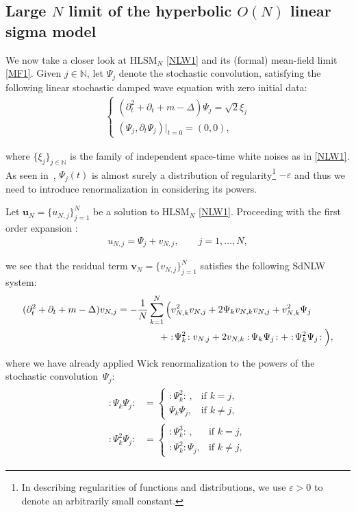 \documentclass[letterpaper, 11pt,  reqno]{amsart}
\newcommand{\1}{\hspace{0.5mm}\text{I}\hspace{0.2mm}}
\newcommand{\noi}{\noindent}
\newcommand{\N}{\mathbb{N}}
\newcommand{\eps}{\varepsilon}
\newcommand{\Dl}{\Delta}
\newcommand{\dt}{\partial_t}
\newcommand{\HLS}{$\text{HLSM}_N$ }
\newcommand{\wick}[1]{:\!{#1}\!:}
\newcommand{\vv}{\mathbf{v}}
\newcommand{\uu}{\mathbf{u}}
\numberwithin{equation}{section}
\numberwithin{theorem}{section}
\begin{document}
\subsection{Large $N$ limit of the hyperbolic $O (N)$ linear sigma model}
\label{SUBSEC:1.2}


We now take a closer look at \HLS  \eqref{NLW1} and its (formal) mean-field limit \eqref{MF1}. Given  $j \in \N$, let $\Psi_j$ 
denote the stochastic convolution, satisfying  the following linear stochastic damped wave equation with zero initial data:
\begin{align}
\begin{cases}
(\dt^2 + \dt + m - \Dl) \Psi_j = \sqrt{2} \xi_j\\
(\Psi_j, \dt \Psi_j) |_{t = 0} = (0, 0), 
\end{cases}    
\label{psi1}
\end{align}

\noi
where $\{\xi_j \}_{j \in \N}$
is the family of independent space-time white noises as in \eqref{NLW1}.
As seen in~\cite{GKO, GKOT}, 
 $\Psi_j(t)$ is 
 almost surely a distribution of regularity\footnote{In describing regularities of functions and distributions, 
we use $\eps > 0$ to denote an arbitrarily small constant.}
 $- \eps$ and thus we need to introduce renormalization
 in considering its powers.


Let $\uu_N = \{u_{N, j}\}_{j = 1}^N$ be a solution to \HLS \eqref{NLW1}.
 Proceeding  with the  first order expansion \cite{McK, BO96, DPD}:
\begin{align}
    u_{N, j} = \Psi_j + v_{N, j},
\qquad j = 1, \dots, N, 
\label{exp}
\end{align}

\noi
we see that  the residual term $\vv_N = \{v_{N, j}\}_{j = 1}^N$ satisfies the following SdNLW system:
\begin{align}
\begin{split}
(\dt^2 + \dt + m - \Dl) v_{N, j} 
& = - \frac{1}{N} \sum_{k = 1}^N  \Big( 
v_{N, k}^2 v_{N, j}
+ 2 \Psi_k v_{N, k} v_{N, j}
  + v_{N, k}^2 \Psi_j \\
& 
\hphantom{XXXXX}
 + \wick{\Psi_k^2} v_{N, j} + 2 v_{N, k} \wick{ \Psi_k \Psi_j } 
+ \wick{\Psi_k^2 \Psi_j} \Big), 
\end{split}
\label{NLW3}
\end{align}

\noi
where we have already applied Wick renormalization 
to the powers of the stochastic convolution~$\Psi_j$:
\begin{align}
\begin{split}
 \wick{ \Psi_k \Psi_j } & = 
\begin{cases}
\wick{\Psi_k^2}\,, & \text{if } k = j, \\
\Psi_k \Psi_j, & \text{if } k \ne j, 
\end{cases}\\
 \wick{\Psi_k^2 \Psi_j} 
&  = 
\begin{cases}
\wick{\Psi_k^3}\,, & \text{if } k = j, \\
\wick{\Psi_k^2} \Psi_j, & \text{if } k \ne j, 
\end{cases}
\end{split}
\label{Wick0}
\end{align}
\end{document}
